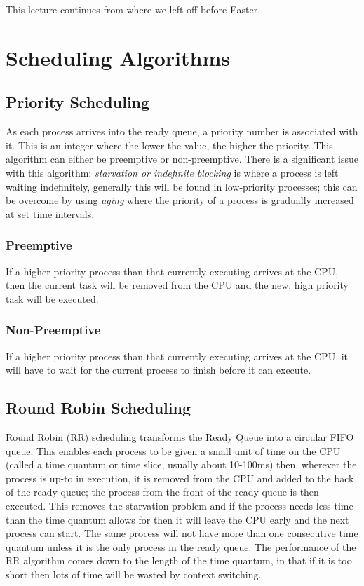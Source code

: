 
This lecture continues from where we left off before Easter.

\section{Scheduling Algorithms}

\subsection{Priority Scheduling}
As each process arrives into the ready queue, a priority number is associated with it. This is an integer where the lower the value, the higher the priority. This algorithm can either be preemptive or non-preemptive. There is a significant issue with this algorithm: \textit{starvation or indefinite blocking} is where a process is left waiting indefinitely, generally this will be found in low-priority processes; this can be overcome by using \textit{aging} where the priority of a process is gradually increased at set time intervals. 
\subsubsection{Preemptive}
If a higher priority process than that currently executing arrives at the CPU, then the current task will be removed from the CPU and the new, high priority task will be executed.
\subsubsection{Non-Preemptive}
If a higher priority process than that currently executing arrives at the CPU, it will have to wait for the current process to finish before it can execute.

\subsection{Round Robin Scheduling}
Round Robin (RR) scheduling transforms the Ready Queue into a circular FIFO queue. This enables each process to be given a small unit of time on the CPU (called a time quantum or time slice, usually about 10-100ms) then, wherever the process is up-to in execution, it is removed from the CPU and added to the back of the ready queue; the process from the front of the ready queue is then executed. This removes the starvation problem and if the process needs less time than the time quantum allows for then it will leave the CPU early and the next process can start. The same process will not have more than one consecutive time quantum unless it is the only process in the ready queue. The performance of the RR algorithm comes down to the length of the time quantum, in that if it is too short then lots of time will be wasted by context switching. 

